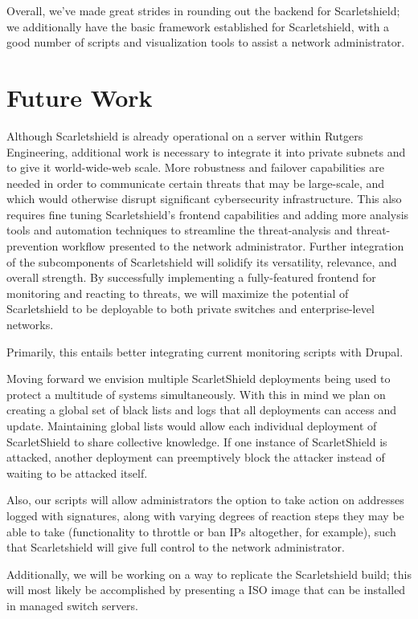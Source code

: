 \documentclass[11.5pt,letterpaper,titlepage]{report}
\begin{document}
Overall, we’ve made great strides in rounding out the backend for Scarletshield; 
we additionally have the basic framework established for Scarletshield, with a 
good number of scripts and visualization tools to assist a network administrator.

\section{Future Work}

Although Scarletshield is already operational on a server within Rutgers
Engineering, additional work is necessary to integrate it into private subnets
and to give it world-wide-web scale. More robustness and failover capabilities
are needed in order to communicate certain threats that may be large-scale, and
which would otherwise disrupt significant cybersecurity infrastructure. This
also requires fine tuning Scarletshield’s frontend capabilities and adding more
analysis tools and automation techniques to streamline the threat-analysis and
threat-prevention workflow presented to the network administrator.  Further
integration of the subcomponents of Scarletshield will solidify its versatility,
relevance, and overall strength.  By successfully implementing a fully-featured
frontend for monitoring and reacting to threats, we will maximize the potential
of Scarletshield to be deployable to both private switches and enterprise-level
networks.

Primarily, this entails better integrating current monitoring scripts with
Drupal.

Moving forward we envision multiple ScarletShield deployments being used to
protect a multitude of systems simultaneously.  With this in mind we plan on
creating a global set of black lists and logs that all deployments can
access and update.  Maintaining global lists would allow each individual
deployment of ScarletShield to share collective knowledge. If one instance
of ScarletShield is attacked, another deployment can preemptively block the
attacker instead of waiting to be attacked itself.

Also, our scripts will allow administrators the option to take action on
addresses logged with signatures, along with varying degrees of reaction
steps they may be able to take (functionality to throttle or ban IPs
altogether, for example), such that Scarletshield will give full control to
the network administrator.

Additionally, we will be working on a way to replicate the Scarletshield
build; this will most likely be accomplished by presenting a ISO image that
can be installed in managed switch servers.
\end{document}
